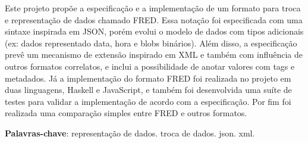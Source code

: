 \begin{resumo}

Este projeto propõe a especificação e a implementação de um formato para
troca e representação de dados chamado FRED. Essa notação foi 
especificada com uma sintaxe inspirada em JSON, porém evolui o modelo de 
dados com tipos adicionais (ex: dados representado data, hora e blobs 
binários). Além disso, a especificação prevê um mecanismo de extensão 
inspirado em XML e também com influência de outros formatos correlatos, 
e inclui a possibilidade de anotar valores com tags e metadados.
Já a implementação do formato FRED foi realizada no projeto em duas 
linguagens, Haskell e JavaScript, e também foi desenvolvida uma suíte de 
testes para validar a implementação de acordo com a especificação. Por 
fim foi realizada uma comparação simples entre FRED e outros formatos.

 \vspace{\onelineskip}
    
 \noindent
 \textbf{Palavras-chave}: representação de dados. troca de dados. json. xml.
\end{resumo}
